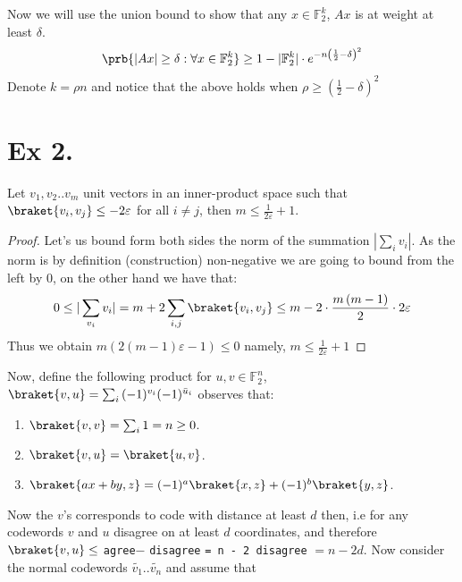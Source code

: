 \documentclass{article}
\newcommand{\FF}{\mathbb{F}}
\begin{document}
Now we will use the union bound to show that any $x\in \FF_{2}^{k}$, $Ax$ is at weight at least $\delta$.  
\begin{equation*}
  \begin{split}
    \prb{|Ax| \ge \delta : \forall x \in \FF_{2}^{k} } \ge 1 - |\FF_{2}^{k}| \cdot e^{-n \left(\frac{1}{2} - \delta \right)^{2} } 
  \end{split}
\end{equation*}
Denote $k = \rho n$ and notice that the above holds when $\rho \ge \left(\frac{1}{2} - \delta \right)^{2} $  
\section{Ex 2.}
\begin{claim}
  Let $v_{1},v_{2} .. v_{m}$ unit vectors in an inner-product space such that  $\braket{v_{i}, v_{j}} \le -2\varepsilon $ for all $i\neq j$, then $m \le \frac{1}{2\varepsilon}+1$.
\end{claim}
\begin{proof}
  Let's us bound form both sides the norm of the summation $|\sum_{i}{v_{i}}|$. As the norm is by definition (construction) non-negative we are going to bound from the left by $0$, on the other hand we have that: 
  \begin{equation*}
    \begin{split}
      0 \le |\sum_{v_{i}}{v_{i}}| = m + 2\sum_{i,j}{\braket{v_{i},v_{j}}} \le m - 2 \cdot \frac{m\left( m-1 \right)}{2} \cdot 2\varepsilon  
    \end{split}
  \end{equation*}
  Thus we obtain $ m\left( 2(m-1)\varepsilon - 1  \right) \le 0 $ namely, $m \le \frac{1}{2\varepsilon} + 1$   
\end{proof}
Now, define the following product for $u,v \in \FF_{2}^{n} $, $\braket{v,u} = \sum_{i}{ (-1)^{v_{i}} (-1)^{\bar{u}_{i}}  }$ observes that: 
\begin{enumerate}
  \item $\braket{v,v} = \sum_{i}{ 1  } = n \ge 0 $.
  \item $\braket{v,u} = \braket{u,v}$.
  \item $\braket{ax + by,z} = (-1)^{a}\braket{x,z} + (-1)^{b}\braket{y,z}$. 
\end{enumerate}

Now the $v$'s corresponds to code with distance at least $d$ then, i.e for any codewords $v$ and $u$ disagree on at least $d$ coordinates, and therefore $\braket{v,u} \le$ \verb|agree|$-$ \verb|disagree| \verb|= n - 2 disagree| $=n -2d$. Now consider the normal codewords $\tilde{v_{1}} .. \tilde{v_{n}}$ and assume that 
\end{document}
